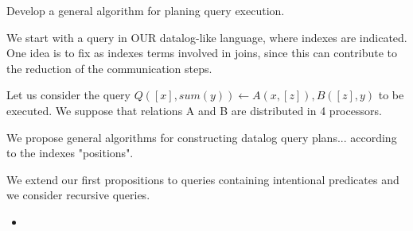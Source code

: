 Develop  a general  algorithm for planing query execution.

We start with  a query in OUR  datalog-like language, where indexes are indicated. 
One idea is to fix as indexes  terms involved in joins, since this can contribute to the reduction of the communication steps. 

Let us consider the query
$Q([x], sum(y)) \leftarrow A(x, [z]), B([z], y)$
to be executed. We suppose that relations A and B are distributed in 4 processors.

We propose general algorithms for constructing datalog query plans... according to the indexes "positions". 

We extend our first propositions to queries containing intentional predicates and we consider recursive queries.




\begin{itemize}
\item  
\end{itemize}